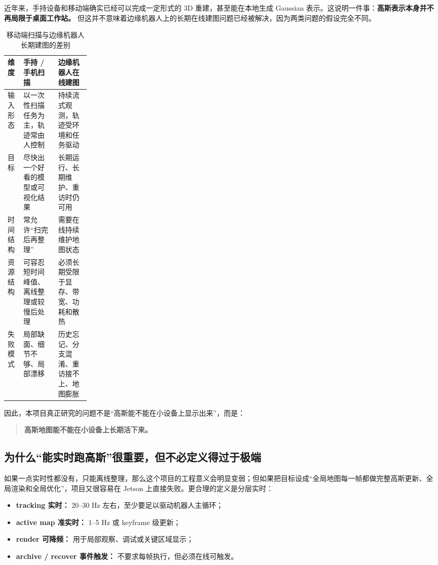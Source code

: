 \documentclass[12pt]{article}
\begin{document}
近年来，手持设备和移动端确实已经可以完成一定形式的 3D 重建，甚至能在本地生成 Gaussian 表示。这说明一件事：\textbf{高斯表示本身并不再局限于桌面工作站。} 但这并不意味着边缘机器人上的长期在线建图问题已经被解决，因为两类问题的假设完全不同。

\begin{table}[H]
\centering
\caption{移动端扫描与边缘机器人长期建图的差别}
\label{tab:mobile-vs-edge}
\begin{tabularx}{\linewidth}{>{\raggedright\arraybackslash}p{0.19\linewidth}XX}
\toprule
维度 & 手持 / 手机扫描 & 边缘机器人在线建图 \\
\midrule
输入形态 & 以一次性扫描任务为主，轨迹常由人控制 & 持续流式观测，轨迹受环境和任务驱动 \\
目标 & 尽快出一个好看的模型或可视化结果 & 长期运行、长期维护、重访时仍可用 \\
时间结构 & 常允许“扫完后再整理” & 需要在线持续维护地图状态 \\
资源结构 & 可容忍短时间峰值、离线整理或较慢后处理 & 必须长期受限于显存、带宽、功耗和散热 \\
失败模式 & 局部缺面、细节不够、局部漂移 & 历史忘记、分支混淆、重访接不上、地图膨胀 \\
\bottomrule
\end{tabularx}
\end{table}

因此，本项目真正研究的问题不是“高斯能不能在小设备上显示出来”，而是：
\begin{quote}
\textbf{高斯地图能不能在小设备上长期活下来。}
\end{quote}

\subsection{为什么“能实时跑高斯”很重要，但不必定义得过于极端}

如果一点实时性都没有，只能离线整理，那么这个项目的工程意义会明显变弱；但如果把目标设成“全局地图每一帧都做完整高斯更新、全局渲染和全局优化”，项目又很容易在 Jetson 上直接失败。更合理的定义是分层实时：
\begin{itemize}
  \item \textbf{tracking 实时：} 20--30 Hz 左右，至少要足以驱动机器人主循环；
  \item \textbf{active map 准实时：} 1--5 Hz 或 keyframe 级更新；
  \item \textbf{render 可降频：} 用于局部观察、调试或关键区域显示；
  \item \textbf{archive / recover 事件触发：} 不要求每帧执行，但必须在线可触发。
\end{itemize}
\end{document}
